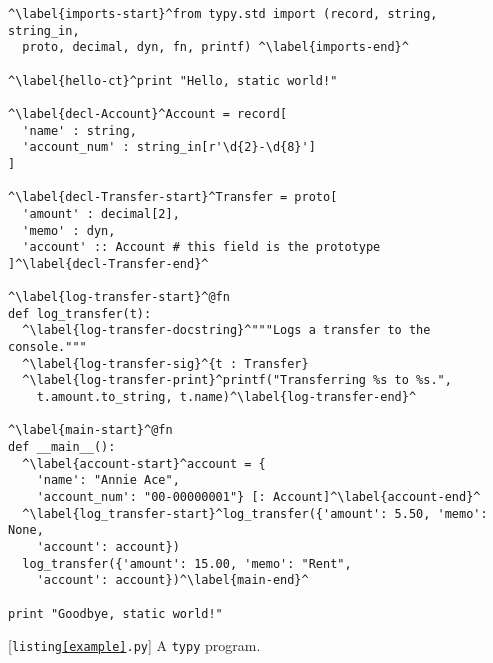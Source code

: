 \documentclass{sigplanconf}
\begin{document}
\begin{codelisting}[t]
\begin{lstlisting}
^\label{imports-start}^from typy.std import (record, string, string_in, 
  proto, decimal, dyn, fn, printf) ^\label{imports-end}^

^\label{hello-ct}^print "Hello, static world!"

^\label{decl-Account}^Account = record[ 
  'name' : string, 
  'account_num' : string_in[r'\d{2}-\d{8}']
]

^\label{decl-Transfer-start}^Transfer = proto[
  'amount' : decimal[2], 
  'memo' : dyn,
  'account' :: Account # this field is the prototype
]^\label{decl-Transfer-end}^

^\label{log-transfer-start}^@fn
def log_transfer(t):
  ^\label{log-transfer-docstring}^"""Logs a transfer to the console."""
  ^\label{log-transfer-sig}^{t : Transfer}
  ^\label{log-transfer-print}^printf("Transferring %s to %s.", 
    t.amount.to_string, t.name)^\label{log-transfer-end}^

^\label{main-start}^@fn
def __main__():
  ^\label{account-start}^account = {
    'name': "Annie Ace", 
    'account_num': "00-00000001"} [: Account]^\label{account-end}^
  ^\label{log_transfer-start}^log_transfer({'amount': 5.50, 'memo': None, 
    'account': account})
  log_transfer({'amount': 15.00, 'memo': "Rent",
    'account': account})^\label{main-end}^
  
print "Goodbye, static world!"
\end{lstlisting}
\caption{[\texttt{listing\ref{example}.py}] A \texttt{typy} program.}
\label{example}
\end{codelisting}
\end{document}
